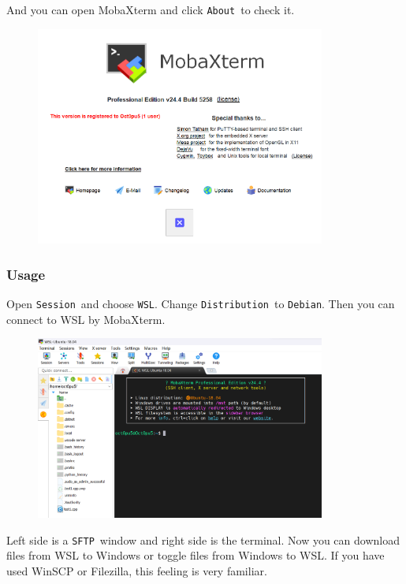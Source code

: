 \documentclass[12pt]{ctexart}
\begin{document}
And you can open MobaXterm and click \texttt{About}\ to check it.

\begin{figure}[H]
    \centering
    \includegraphics[width=0.85\textwidth,keepaspectratio]{assets/Linux/2.2 MobaXterm, go ssh it!/3.png}
\end{figure}

\subsubsection{\textbf{Usage}}

Open \texttt{Session}\ and choose \texttt{WSL}. Change
\texttt{Distribution}\ to \texttt{Debian}. Then you can connect to WSL by
MobaXterm.

\begin{figure}[H]
    \centering
    \includegraphics[width=0.85\textwidth,keepaspectratio]{assets/Linux/2.2 MobaXterm, go ssh it!/4.png}
\end{figure}

Left side is a \texttt{SFTP}\ window and right side is the terminal. Now
you can download files from WSL to Windows or toggle files from Windows
to WSL. If you have used WinSCP or Filezilla, this feeling is very
familiar.
\end{document}
